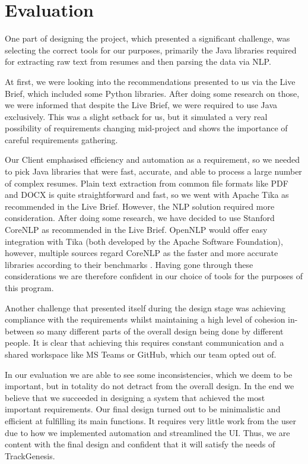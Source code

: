\chapter{Evaluation}
One part of designing the project, which presented a significant challenge, was selecting the correct tools for our purposes, primarily the Java libraries required for extracting raw text from resumes and then parsing the data via NLP.

At first, we were looking into the recommendations presented to us via the Live Brief, which included some Python libraries. After doing some research on those, we were informed that despite the Live Brief, we were required to use Java exclusively. This was a slight setback for us, but it simulated a very real possibility of requirements changing mid-project and shows the importance of careful requirements gathering.

Our Client emphasised efficiency and automation as a requirement, so we needed to pick Java libraries that were fast, accurate, and able to process a large number of complex resumes. Plain text extraction from common file formats like PDF and DOCX is quite straightforward and fast, so we went with Apache Tika as recommended in the Live Brief. However, the NLP solution required more consideration. After doing some research, we have decided to use Stanford CoreNLP as recommended in the Live Brief. OpenNLP would offer easy integration with Tika (both developed by the Apache Software Foundation), however, multiple sources regard CoreNLP as the faster and more accurate libraries according to their benchmarks \parencite{Schmitt2019,Nanavati2015}. Having gone through these considerations we are therefore confident in our choice of tools for the purposes of this program.

Another challenge that presented itself during the design stage was achieving compliance with the requirements whilst maintaining a high level of cohesion in-between so many different parts of the overall design being done by different people. It is clear that achieving this requires constant communication and a shared workspace like MS Teams or GitHub, which our team opted out of. 

In our evaluation we are able to see some inconsistencies, which we deem to be important, but in totality do not detract from the overall design. In the end we believe that we succeeded in designing a system that achieved the most important requirements. Our final design turned out to be minimalistic and efficient at fulfilling its main functions. It requires very little work from the user due to how we implemented automation and streamlined the UI. Thus, we are content with the final design and confident that it will satisfy the needs of TrackGenesis.